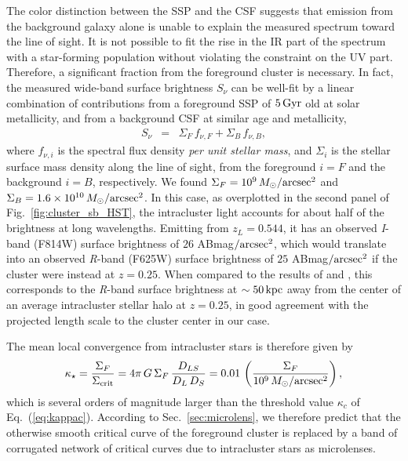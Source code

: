 \documentclass{aastex6}
\newcommand{\refeq}[1]{Eq.~(\ref{eq:#1})}
\newcommand{\reffig}[1]{Fig.~\ref{fig:#1}}
\newcommand{\refsec}[1]{Sec.~\ref{sec:#1}}
\newcommand{\ba}{\begin{eqnarray}}
\newcommand{\ea}{\end{eqnarray}}
\begin{document}
The color distinction between the SSP and the CSF suggests that emission from the background galaxy alone is unable to explain the measured spectrum toward the line of sight. It is not possible to fit the rise in the IR part of the spectrum with a star-forming population without violating the constraint on the UV part. Therefore, a significant fraction from the foreground cluster is necessary. In fact, the measured wide-band surface brightness $S_\nu$ can be well-fit by a linear combination of contributions from a foreground SSP of $5\,{\rm Gyr}$ old at solar metallicity, and from a background CSF at similar age and metallicity,
\ba
\label{eq:SBspecFplusB}
S_\nu & = & \Sigma_F\, f_{\nu,F} + \Sigma_B\, f_{\nu,B},
\ea
where $f_{\nu,i}$ is the spectral flux density {\it per unit stellar mass}, and $\Sigma_i$ is the stellar surface mass density along the line of sight, from the foreground $i=F$ and the background $i=B$, respectively. We found $\Sigma_F=10^9\,M_\odot/{\rm arcsec}^2$ and $\Sigma_B = 1.6\times 10^{10}\,M_\odot/{\rm arcsec}^2$. In this case, as overplotted in the second panel of \reffig{cluster_sb_HST}, the intracluster light accounts for about half of the brightness at long wavelengths. Emitting from $z_L=0.544$, it has an observed {\em I}-band (F814W) surface brightness of $26$ ABmag$/{\rm arcsec}^2$, which would translate into an observed {\em R}-band (F625W) surface brightness of $25$ ABmag$/{\rm arcsec}^2$ if the cluster were instead at $z=0.25$. When compared to the results of \cite{2005MNRAS.358..949Z} and \cite{Puchwein:2010ec}, this corresponds to the {\em R}-band surface brightness at $\sim 50\,{\rm kpc}$ away from the center of an average intracluster stellar halo at $z=0.25$, in good agreement with the projected length scale to the cluster center in our case.

The mean local convergence from intracluster stars is therefore given by
\ba
\label{eq:kappastar_fiducial}
\kappa_\star = \frac{\Sigma_F}{\Sigma_{\rm crit}} = 4\pi\,G\,\Sigma_F\,\frac{D_{LS}}{D_L\,D_S} = 0.01\,\left( \frac{\Sigma_F}{10^9\,M_\odot/{\rm arcsec}^2} \right),
\ea
which is several orders of magnitude larger than the threshold value $\kappa_c$ of \refeq{kappac}. According to \refsec{microlens}, we therefore predict that the otherwise smooth critical curve of the foreground cluster is replaced by a band of corrugated network of critical curves due to intracluster stars as microlenses.





\end{document}
